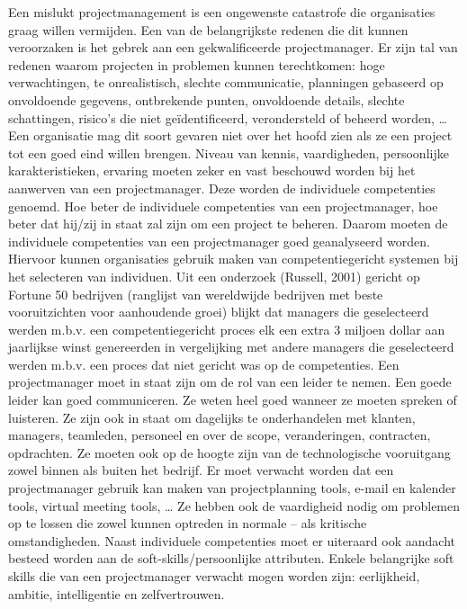 \documentclass{hogent-article}
\begin{document}
    Een mislukt projectmanagement is een ongewenste catastrofe die organisaties graag willen vermijden. Een van de belangrijkste redenen die dit kunnen veroorzaken is het gebrek aan een gekwalificeerde projectmanager. Er zijn tal van redenen waarom projecten in problemen kunnen terechtkomen: hoge verwachtingen, te onrealistisch, slechte communicatie, planningen gebaseerd op onvoldoende gegevens, ontbrekende punten, onvoldoende details, slechte schattingen, risico’s die niet geïdentificeerd, verondersteld of beheerd worden, … Een organisatie mag dit soort gevaren niet over het hoofd zien als ze een project tot een goed eind willen brengen. Niveau van kennis, vaardigheden, persoonlijke karakteristieken, ervaring moeten zeker en vast beschouwd worden bij het aanwerven van een projectmanager. Deze worden de individuele competenties genoemd. Hoe beter de individuele competenties van een projectmanager, hoe beter dat hij/zij in staat zal zijn om een project te beheren. Daarom moeten de individuele competenties van een projectmanager goed geanalyseerd worden. Hiervoor kunnen organisaties gebruik maken van competentiegericht systemen bij het selecteren van individuen. Uit een onderzoek (Russell, 2001) gericht op Fortune 50 bedrijven (ranglijst van wereldwijde bedrijven met beste vooruitzichten voor aanhoudende groei) blijkt dat managers die geselecteerd werden m.b.v. een competentiegericht proces elk een extra 3 miljoen dollar aan jaarlijkse winst genereerden in vergelijking met andere managers die geselecteerd werden m.b.v. een proces dat niet gericht was op de competenties. Een projectmanager moet in staat zijn om de rol van een leider te nemen. Een goede leider kan goed communiceren. Ze weten heel goed wanneer ze moeten spreken of luisteren. Ze zijn ook in staat om dagelijks te onderhandelen met klanten, managers, teamleden, personeel en over de scope, veranderingen, contracten, opdrachten. Ze moeten ook op de hoogte zijn van de technologische vooruitgang zowel binnen als buiten het bedrijf. Er moet verwacht worden dat een projectmanager gebruik kan maken van projectplanning tools, e-mail en kalender tools, virtual meeting tools, … Ze hebben ook de vaardigheid nodig om problemen op te lossen die zowel kunnen optreden in normale – als kritische omstandigheden. Naast individuele competenties moet er uiteraard ook aandacht besteed worden aan de soft-skills/persoonlijke attributen. Enkele belangrijke soft skills die van een projectmanager verwacht mogen worden zijn: eerlijkheid, ambitie, intelligentie en zelfvertrouwen.
    
\end{document}
